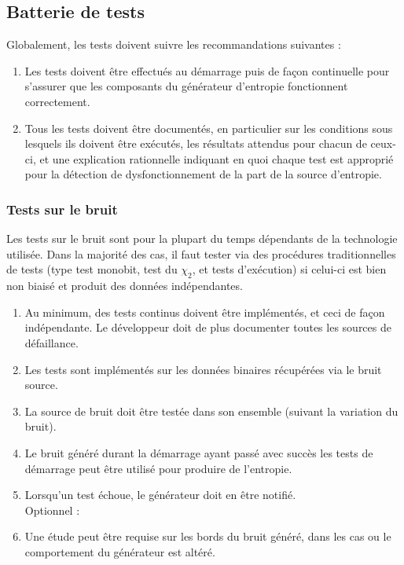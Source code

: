 \subsection{Batterie de tests}
Globalement, les tests doivent suivre les recommandations suivantes :
\begin{enumerate}
\item Les tests doivent être effectués au démarrage puis de façon continuelle pour s'assurer que les composants du générateur d'entropie fonctionnent correctement.
\item Tous les tests doivent être documentés, en particulier sur les conditions sous lesquels ils doivent être exécutés, les résultats attendus pour chacun de ceux-ci, et une explication rationnelle indiquant en quoi chaque test est approprié pour la détection de dysfonctionnement de la part de la source d'entropie. 
\end{enumerate}

\subsubsection{Tests sur le bruit}
Les tests sur le bruit sont pour la plupart du temps dépendants de la technologie utilisée. Dans la majorité des cas, il faut tester via des procédures traditionnelles de tests (type test monobit, test du $\chi_2$, et tests d'exécution) si celui-ci est bien non biaisé et produit des données indépendantes.
\begin{enumerate}
\item Au minimum, des tests continus doivent être implémentés, et ceci de façon indépendante. Le développeur doit de plus documenter toutes les sources de défaillance.
\item Les tests sont implémentés sur les données binaires récupérées via le bruit source.
\item La source de bruit doit être testée dans son ensemble (suivant la variation du bruit).
\item Le bruit généré durant la démarrage ayant passé avec succès les tests de démarrage peut être utilisé pour produire de l'entropie.
\item Lorsqu'un test échoue, le générateur doit en être notifié.\\

Optionnel : 
\item Une étude peut être requise sur les bords du bruit généré, dans les cas ou le comportement du générateur est altéré.
\end{enumerate}


